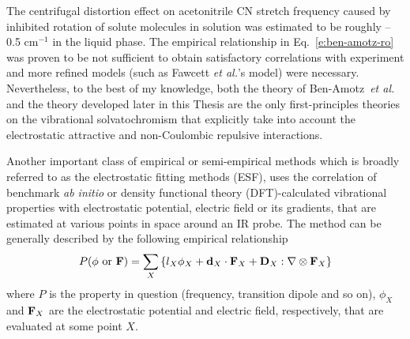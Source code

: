 \documentclass[a4paper,titlepage,twoside,fleqn,12pt]{book}
\begin{document}
\begin{refsection}
The centrifugal distortion effect on acetonitrile CN stretch frequency 
caused by inhibited rotation of solute molecules
in solution was estimated to be roughly --0.5 cm$^{-1}$ in the liquid phase.  
The empirical relationship in Eq.~\eqref{e:ben-amotz-ro} was proven to be not sufficient to obtain 
satisfactory correlations with experiment and more refined
models (such as Fawcett \emph{et al.}'s model) were necessary. \citep{Reimers.Hall.JACS.1999} 
Nevertheless, 
to the best of my knowledge, both the theory of Ben-Amotz~\emph{et al.} \citep{Ben-Amotz.Lee.Cho.List.JCP.1992} 
and the theory
developed later in this Thesis are the only first-principles theories on the
vibrational solvatochromism that explicitly take into account the electrostatic 
attractive and non\hyp{}Coulombic repulsive interactions.

Another important class of empirical or semi\hyp{}empirical methods which is broadly referred 
to as the electrostatic fitting methods (ESF), uses the correlation of benchmark 
\emph{ab initio} or density functional theory (DFT)-calculated vibrational properties
with electrostatic potential, electric field or its gradients, that are estimated at various
points in space around an IR probe. \citep{Kwac.Cho.II.JCP.2003,Ham.Kim.Lee.Cho.JCP.2003,Bour.Keiderling.JCP.2003,
Schmidt.Corcelli.Skinner.JCP.2004,Corcelli.Lawrence.Skinner.JCP.2004,Hahn.Lee.Cho.JCP.2004,Kwac.Lee.Cho.JCP.2004,
Choi.Hahn.Cho.IJQC.2005,Kwac.Cho.JRS.2005,Watson.Hirst.MP.2005,
DeCamp.DeFlores.McCracken.Tokmakoff.Kwac.Cho.JPCB.2005,Hayashi.Jansen.Zhuang.Mukamel.JPCA.2005,
Hayashi.Zhuang.Mukamel.JPCA.2005,Bour.Michalik.Kapitan.JCP.2005,
Jansen.Dijkstra.Watson.Hirst.Knoester.JCP.2006,
Jansen.Knoester.JCP.2006,
Choi.Oh.Lee.Lee.Cho.JCP.2008,Oh.Choi.Lee.Han.Lee.Cho.JCP.2008,
Choi.Oh.Cho.JCP.2008,
Lin.Shorb.Mukherjee.Zanni.Skinner.JPCB.2009,Lee.Choi.Cho.PCCP.2010,Choi.Cho.JCP.2011,
Roy.Lessing.Meisl.Ganim.Tokmakoff.Knoester.Jansen.JCP.2011,Choi.Raleigh.Cho.JCPL.2011,
Lee.Choi.Cho.JCP.2012,Torii.JCPL.2015,Torii.Noge.PCCP.2016}
%
The method can be generally described by the following empirical relationship
%
\begin{equation} \label{e:esf}
 P(\phi \text{ or } {\bf F}) = \sum_X \left\{ l_X \phi_X + {\bf d}_X \cdot {\bf F}_X + {\bf D}_X : \nabla \otimes {\bf F}_X \right\}
\end{equation}
%
where $P$ is the property in question (frequency, transition dipole and so on), 
$\phi_X$ and ${\bf F}_X$ are the electrostatic potential and electric field, respectively, that are
evaluated at some point $X$.

\end{refsection}
\end{document}
